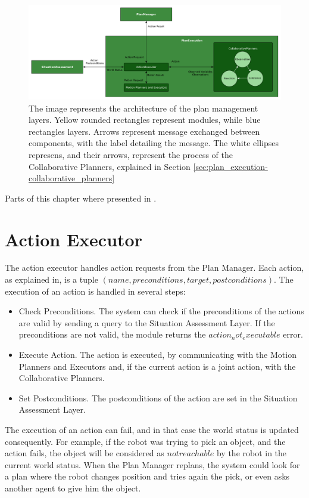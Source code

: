 \begin{figure}[h!]
	\centering
	\includegraphics[clip,scale=0.38]{img/plan_execution/architecture.pdf}
	\caption{The image represents the architecture of the plan management layers. Yellow rounded rectangles represent modules, while blue rectangles layers. Arrows represent message exchanged between components, with the label detailing the message. The white ellipses represens, and their arrows, represent the process of the Collaborative Planners, explained in Section \ref{sec:plan_execution-collaborative_planners} }
	\label{fig:plan_execution:architecture}
\end{figure}


Parts of this chapter where presented in \cite{fioreiser2014}.

\section{Action Executor}
\label{sec:plan_execution-action_executor}
The action executor handles action requests from the Plan Manager. Each action, as explained in, is a tuple $(name, preconditions, target, postconditions)$. The execution of an action is handled in several steps:
\begin{itemize}
\item Check Preconditions. The system can check if the preconditions of the actions are valid by sending a query to the Situation Assessment Layer. If the preconditions are not valid, the module returns the $action_not_executable$ error.
\item Execute Action. The action is executed, by communicating with the Motion Planners and Executors and, if the current action is a joint action, with the Collaborative Planners.
\item Set Postconditions. The postconditions of the action are set in the Situation Assessment Layer.
\end{itemize}

The execution of an action can fail, and in that case the world status is updated consequently. For example, if the robot was trying to pick an object, and the action fails, the object will be considered as $not reachable$ by the robot in the current world status. When the Plan Manager replans, the system could look for a plan where the robot changes position and tries again the pick, or even asks another agent to give him the object.

